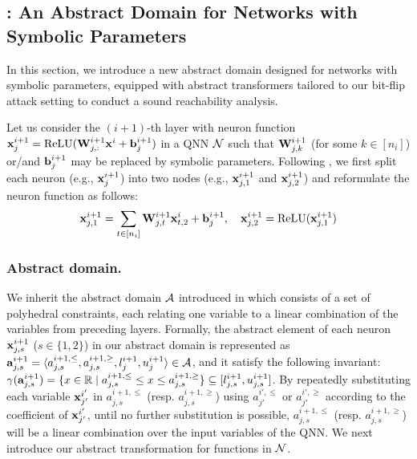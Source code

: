\subsection{\symPoly: An Abstract Domain for Networks with Symbolic Parameters}\label{sec:deepPolyR}

In this section, we introduce a new abstract domain \symPoly designed for networks with symbolic parameters, equipped with abstract transformers tailored to our bit-flip attack setting to conduct a sound reachability analysis. 


Let us consider the $(i+1)$-th layer with neuron function ${\mathbf{x}}^{i+1}_j=\text{ReLU}({\mathbf{W}}^{i+1}_{j,:}{\mathbf{x}}^{i}+{\mathbf{b}}^{i+1}_j)$ in a QNN ${\mathcal{N}}$ such that ${\mathbf{W}}^{i+1}_{j,k}$ (for some $k\in[n_i]$) or/and ${\mathbf{b}}^{i+1}_j$ may be replaced by symbolic parameters.
Following \deepPoly, we first split each neuron (e.g., ${\mathbf{x}}^{i+1}_j$) into two nodes (e.g., ${\mathbf{x}}^{i+1}_{j,1}$ and ${\mathbf{x}}^{i+1}_{j,2}$) and reformulate the neuron function as follows: 
\[
{\mathbf{x}}^{i+1}_{j,1}= \sum_{t\in[n_i]} {\mathbf{W}}^{i+1}_{j,t}{\mathbf{x}}^{i}_{t,2}+{\mathbf{b}}^{i+1}_j, \quad {\mathbf{x}}^{i+1}_{j,2}= \text{ReLU}({\mathbf{x}}^{i+1}_{j,1})
\]

\subsubsection{Abstract domain.} We inherit the abstract domain ${\mathcal{A}}$ introduced in \deepPoly which consists of a set of polyhedral constraints, each relating one variable to a linear combination of the variables from preceding layers. 
Formally, the abstract element of each neuron ${\mathbf{x}}^{i+1}_{j,s}$ ($s\in\{1,2\}$) in our abstract domain is represented as ${\mathbf{a}}^{i+1}_{j,s}=\langle a^{i+1,\le}_{j,s}, a^{i+1,\ge}_{j,s}, l^{i+1}_j, u^{i+1}_j\rangle \in {\mathcal{A}}$, and it satisfy the following invariant: $\gamma({\mathbf{a}}^{i+1}_{j,s})=\{x\in\mathbb{R}\mid a^{i+1,\le}_{j,s}\le x\le a^{i+1,\ge}_{j,s}\}\subseteq [l^{i+1}_{j,s},u^{i+1}_{j,s}]$. By repeatedly substituting each variable ${\mathbf{x}}^{i'}_{j'}$ in $a^{i+1,\le}_{j,s}$ (resp. $a^{i+1,\ge}_{j,s}$) using $a^{i',\le}_{j'}$ or $a^{i',\ge}_{j'}$ according to the coefficient of ${\mathbf{x}}^{i'}_{j'}$, until no further substitution is possible, $a^{i+1,\le}_{j,s}$ (resp. $a^{i+1,\ge}_{j,s}$) will be a linear combination over the input variables of the QNN.
% 
We next introduce our abstract transformation for functions in ${\mathcal{N}}$.

